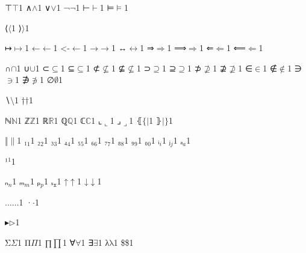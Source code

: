 {{⊤}{{\ensuremath{\top}}}1
{∧}{{\ensuremath{\wedge}}}1
{∨}{{\ensuremath{\vee}}}1
{¬}{{\ensuremath{\neg}}}1
{⊢}{{\ensuremath{\vdash}}}1
{⊨}{{\ensuremath{\models}}}1

{⟨}{{\ensuremath{\langle}}}1
{⟩}{{\ensuremath{\rangle}}}1

{↦}{{\ensuremath{\mapsto}}}1
{←}{{\ensuremath{\leftarrow}}}1
{<-}{{\ensuremath{\leftarrow}}}1
{→}{{\ensuremath{\rightarrow}}}1
{↔}{{\ensuremath{\leftrightarrow}}}1
{⇒}{{\ensuremath{\Rightarrow}}}1
{⟹}{{\ensuremath{\Longrightarrow}}}1
{⇐}{{\ensuremath{\Leftarrow}}}1
{⟸}{{\ensuremath{\Longleftarrow}}}1

{∩}{{\ensuremath{\cap}}}1
{∪}{{\ensuremath{\cup}}}1
{⊂}{{\ensuremath{\subseteq}}}1
{⊆}{{\ensuremath{\subseteq}}}1
{⊄}{{\ensuremath{\nsubseteq}}}1
{⊈}{{\ensuremath{\nsubseteq}}}1
{⊃}{{\ensuremath{\supseteq}}}1
{⊇}{{\ensuremath{\supseteq}}}1
{⊅}{{\ensuremath{\nsupseteq}}}1
{⊉}{{\ensuremath{\nsupseteq}}}1
{∈}{{\ensuremath{\in}}}1
{∉}{{\ensuremath{\notin}}}1
{∋}{{\ensuremath{\ni}}}1
{∌}{{\ensuremath{\notni}}}1
{∅}{{\ensuremath{\emptyset}}}1

{∖}{{\ensuremath{\setminus}}}1
{†}{{\ensuremath{\dag}}}1

{ℕ}{{\ensuremath{\mathbb{N}}}}1
{ℤ}{{\ensuremath{\mathbb{Z}}}}1
{ℝ}{{\ensuremath{\mathbb{R}}}}1
{ℚ}{{\ensuremath{\mathbb{Q}}}}1
{ℂ}{{\ensuremath{\mathbb{C}}}}1
{⌞}{{\ensuremath{\llcorner}}}1
{⌟}{{\ensuremath{\lrcorner}}}1
{⦃}{{\ensuremath{\{\!|}}}1
{⦄}{{\ensuremath{|\!\}}}}1

{‖}{{\ensuremath{\|}}}1
{₁}{{\ensuremath{_1}}}1
{₂}{{\ensuremath{_2}}}1
{₃}{{\ensuremath{_3}}}1
{₄}{{\ensuremath{_4}}}1
{₅}{{\ensuremath{_5}}}1
{₆}{{\ensuremath{_6}}}1
{₇}{{\ensuremath{_7}}}1
{₈}{{\ensuremath{_8}}}1
{₉}{{\ensuremath{_9}}}1
{₀}{{\ensuremath{_0}}}1
{ᵢ}{{\ensuremath{_i}}}1
{ⱼ}{{\ensuremath{_j}}}1
{ₐ}{{\ensuremath{_a}}}1

{¹}{{\ensuremath{^1}}}1

{ₙ}{{\ensuremath{_n}}}1
{ₘ}{{\ensuremath{_m}}}1
{ₚ}{{\ensuremath{_p}}}1
{ₓ}{{\ensuremath{_{\mathtt{x}}}}}1
{↑}{{\ensuremath{\uparrow}}}1
{↓}{{\ensuremath{\downarrow}}}1

{...}{{\ensuremath{\ldots}}}1
{·}{{\ensuremath{\cdot}}}1

{▸}{{\ensuremath{\triangleright}}}1

{Σ}{{\color{symbolcolor}\ensuremath{\Sigma}}}1
{Π}{{\color{symbolcolor}\ensuremath{\Pi}}}1
{∏}{{\color{symbolcolor}\ensuremath{\prod}}}1
{∀}{{\color{symbolcolor}\ensuremath{\forall}}}1
{∃}{{\color{symbolcolor}\ensuremath{\exists}}}1
{λ}{{\color{symbolcolor}\ensuremath{\mathrm{\lambda}}}}1
{\$}{{\color{symbolcolor}\$}}1

}
